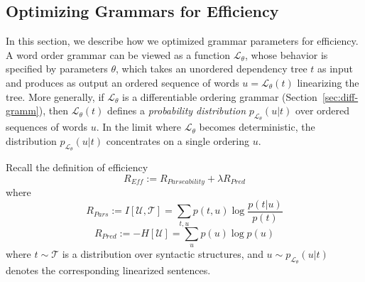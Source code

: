 \documentclass[10pt,twoside,lineno]{article}
\newcommand{\utterance}{\mathcal{U}}
\newcommand{\tree}{\mathcal{T}}
\begin{document}
\subsection{Optimizing Grammars for Efficiency}\label{sec:optim-eff}

In this section, we describe how we optimized grammar parameters for efficiency.
A word order grammar can be viewed as a function $\mathcal{L}_\theta$, whose behavior is specified by parameters $\theta$, which takes an unordered dependency tree $t$ as input and produces as output an ordered sequence of words $u = \mathcal{L}_\theta(t)$ linearizing the tree.
More generally, if $\mathcal{L}_\theta$ is a differentiable ordering grammar (Section~\ref{sec:diff-gramm}), then $\mathcal{L}_\theta(t)$ defines a \emph{probability distribution} $p_{\mathcal{L}_\theta}(u|t)$ over ordered sequences of words $u$.
In the limit where $\mathcal{L}_\theta$ becomes deterministic, the distribution $p_{\mathcal{L}_\theta}(u|t)$ concentrates on a single ordering $u$.

Recall the definition of efficiency
\begin{equation}\label{eq:efficiency-recall}
	R_{\textit{Eff}} := R_{\textit{Parseability}} + \lambda R_\textit{Pred}
\end{equation}
where
\begin{equation}
	R_{Pars} := I[\utterance,\tree] = \sum_{t,u} p(t,u) \log \frac{p(t|u)}{p(t)} 
\end{equation}
\begin{equation}
	R_{Pred} := - H[\utterance] = \sum_{u} p(u) \log p(u)
\end{equation}
where $t \sim \tree$ is a distribution over syntactic structures, and $u \sim p_{\mathcal{L}_\theta}(u|t)$ denotes the corresponding linearized sentences.
\end{document}
